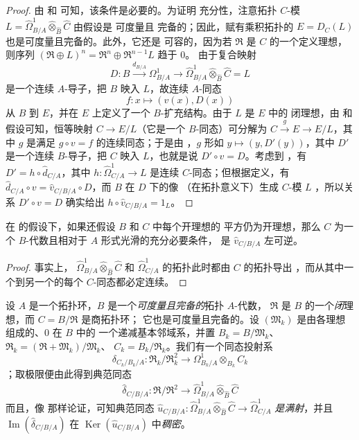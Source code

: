 \begin{proof}
由  和  可知，该条件是必要的。为证明
充分性，注意拓扑 $C$-模
$L=\widehat{\Omega}^1_{B/A}\widehat\otimes_{\widehat B}\widehat C$ 由假设是
可度量且
完备的；因此，赋有乘积拓扑的 $E=D_C(L)$ 也是可度量且完备的。此外，它还是
可容的，因为若 $\mathfrak{R}$ 是 $C$ 的一个定义理想，则序列
$(\mathfrak{R}\oplus L)^n=\mathfrak{R}^n\oplus\mathfrak{R}^{n-1}L$ 趋于 $0$。
由于复合映射
\[
  D:B\xrightarrow{d_{B/A}}\Omega^1_{B/A}\to
  \widehat{\Omega}^1_{B/A}\widehat\otimes_{\widehat B}\widehat C=L
\]
是一个连续 $A$-导子，把 $B$ 映入 $L$，故连续 $A$-同态
\[
  f:x\longmapsto(v(x),D(x))
\]
从 $B$ 到 $E$，并在 $E$ 上定义了一个 $B$-扩充结构。由于 $L$ 是 $E$ 中的
闭理想，由  和假设可知，恒等映射 $C\to E/L$（它是一个
$B$-同态）可分解为 $C\xrightarrow{g}E\to E/L$，其中 $g$ 是满足
$g\circ v=f$ 的连续同态；于是由 ，$g$ 形如
$y\mapsto(y,D'(y))$，其中 $D'$ 是一个连续 $B$-导子，把 $C$ 映入 $L$，也就是说
$D'\circ v=D$。考虑到 ，有
$D'=h\circ\widehat d_{C/A}$，其中
$h:\widehat{\Omega}^1_{C/A}\to L$ 是连续 $C$-同态；但根据定义，有
$\widehat d_{C/A}\circ v=\widehat v_{C/B/A}\circ D$，而 $B$ 在 $D$ 下的像
（在拓扑意义下）生成 $C$-模 $L$ ，所以关系
$D'\circ v=D$ 确实给出 $h\circ\widehat v_{C/B/A}=1_L$。
\end{proof}

\begin{corollary}[20.7.19]
\label{0.20.7.19-fr}
在  的假设下，如果还假设 $B$ 和 $C$ 中每个开理想的
平方仍为开理想，那么 $C$ 为一个 $B$-代数且相对于 $A$ 形式光滑的充分必要条件，
是 $\widehat v_{C/B/A}$ 左可逆。
\end{corollary}

\begin{proof}
事实上，
$\widehat{\Omega}^1_{B/A}\widehat\otimes_{\widehat B}\widehat C$ 和
$\widehat{\Omega}^1_{C/A}$ 的拓扑此时都由 $C$ 的拓扑导出
，而从其中一个到另一个的每个 $C$-同态都必定连续。
\end{proof}

\begin{env}[20.7.20]
\label{0.20.7.20-fr}
设 $A$ 是一个拓扑环，$B$ 是一个\emph{可度量且完备的}拓扑 $A$-代数，
$\mathfrak{R}$ 是 $B$ 的一个\emph{闭}理想，而 $C=B/\mathfrak{R}$ 是商拓扑环；
它也是可度量且完备的。设 $(\mathfrak{M}_k)$ 是由各理想组成的、$0$ 在 $B$ 中的
一个递减基本邻域系，并置
$B_k=B/\mathfrak{M}_k$、
$\mathfrak{R}_k=(\mathfrak{R}+\mathfrak{M}_k)/\mathfrak{M}_k$、
$C_k=B_k/\mathfrak{R}_k$。我们有一个同态投射系
\[
  \delta_{C_k/B_k/A}:\mathfrak{R}_k/\mathfrak{R}_k^2\to
  \Omega^1_{B_k/A}\otimes_{B_k}C_k
\]
；取极限便由此得到典范同态
\[
  \widehat\delta_{C/B/A}:\mathfrak{R}/\mathfrak{R}^2\to
  \widehat{\Omega}^1_{B/A}\widehat\otimes_{\widehat B}\widehat C
\]
而且，像  那样论证，可知典范同态
$\widehat u_{C/B/A}:\widehat{\Omega}^1_{B/A}
\widehat\otimes_{\widehat B}\widehat C\to\widehat{\Omega}^1_{C/A}$
\emph{是满射}，并且 $\operatorname{Im}(\widehat\delta_{C/B/A})$ 在
$\operatorname{Ker}(\widehat u_{C/B/A})$ 中\emph{稠密}。
\end{env}

